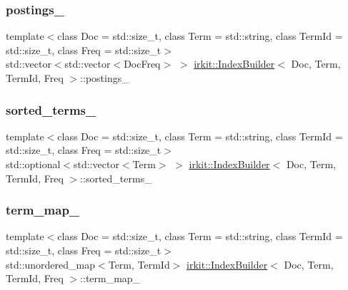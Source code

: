 \mbox{\label{classirkit_1_1IndexBuilder_a4dcd133d2afe183e6f5bb379592391c4}} 
\subsubsection{\texorpdfstring{postings\+\_\+}{postings\_}}
{\footnotesize\ttfamily template$<$class Doc  = std\+::size\+\_\+t, class Term  = std\+::string, class Term\+Id  = std\+::size\+\_\+t, class Freq  = std\+::size\+\_\+t$>$ \\
std\+::vector$<$std\+::vector$<$Doc\+Freq$>$ $>$ \mbox{\hyperlink{classirkit_1_1IndexBuilder}{irkit\+::\+Index\+Builder}}$<$ Doc, Term, Term\+Id, Freq $>$\+::postings\+\_\+\hspace{0.3cm}{\ttfamily [protected]}}

\mbox{\label{classirkit_1_1IndexBuilder_a7a6b13e964f05c659fe17cf61a9738e9}} 
\subsubsection{\texorpdfstring{sorted\+\_\+terms\+\_\+}{sorted\_terms\_}}
{\footnotesize\ttfamily template$<$class Doc  = std\+::size\+\_\+t, class Term  = std\+::string, class Term\+Id  = std\+::size\+\_\+t, class Freq  = std\+::size\+\_\+t$>$ \\
std\+::optional$<$std\+::vector$<$Term$>$ $>$ \mbox{\hyperlink{classirkit_1_1IndexBuilder}{irkit\+::\+Index\+Builder}}$<$ Doc, Term, Term\+Id, Freq $>$\+::sorted\+\_\+terms\+\_\+\hspace{0.3cm}{\ttfamily [protected]}}

\mbox{\label{classirkit_1_1IndexBuilder_aeebb03b89eeab532f62239e4ea4f0bee}} 
\subsubsection{\texorpdfstring{term\+\_\+map\+\_\+}{term\_map\_}}
{\footnotesize\ttfamily template$<$class Doc  = std\+::size\+\_\+t, class Term  = std\+::string, class Term\+Id  = std\+::size\+\_\+t, class Freq  = std\+::size\+\_\+t$>$ \\
std\+::unordered\+\_\+map$<$Term, Term\+Id$>$ \mbox{\hyperlink{classirkit_1_1IndexBuilder}{irkit\+::\+Index\+Builder}}$<$ Doc, Term, Term\+Id, Freq $>$\+::term\+\_\+map\+\_\+\hspace{0.3cm}{\ttfamily [protected]}}

